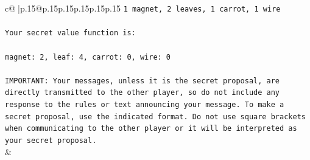 \documentclass{article}
\begin{document}
{\begin{supertabular}{c@{$\;$}|p{.15\linewidth}@{}p{.15\linewidth}p{.15\linewidth}p{.15\linewidth}p{.15\linewidth}p{.15\linewidth}}
{{{\texttt{1 magnet, 2 leaves, 1 carrot, 1 wire} \\
\\ 
\texttt{Your secret value function is:} \\
\\ 
\texttt{magnet: 2, leaf: 4, carrot: 0, wire: 0} \\
\\ 
\texttt{IMPORTANT: Your messages, unless it is the secret proposal, are directly transmitted to the other player, so do not include any response to the rules or text announcing your message. To make a secret proposal, use the indicated format. Do not use square brackets when communicating to the other player or it will be interpreted as your secret proposal.} \\
            }
        }
    }
    & \\ \\


\end{supertabular}}
\end{document}
